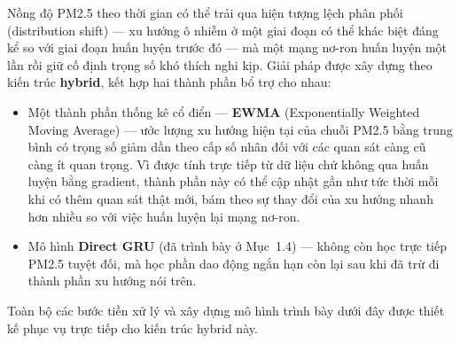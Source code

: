 \documentclass[12pt,oneside]{report}
\begin{document}
Nồng độ PM2.5 theo thời gian có thể trải qua hiện tượng lệch phân phối (distribution shift) — xu hướng ô nhiễm ở một giai đoạn có thể khác biệt đáng kể so với giai đoạn huấn luyện trước đó — mà một mạng nơ-ron huấn luyện một lần rồi giữ cố định trọng số khó thích nghi kịp. Giải pháp được xây dựng theo kiến trúc \textbf{hybrid}, kết hợp hai thành phần bổ trợ cho nhau:

\begin{itemize}
    \item Một thành phần thống kê cổ điển — \textbf{EWMA} (Exponentially Weighted Moving Average) — ước lượng xu hướng hiện tại của chuỗi PM2.5 bằng trung bình có trọng số giảm dần theo cấp số nhân đối với các quan sát càng cũ càng ít quan trọng. Vì được tính trực tiếp từ dữ liệu chứ không qua huấn luyện bằng gradient, thành phần này có thể cập nhật gần như tức thời mỗi khi có thêm quan sát thật mới, bám theo sự thay đổi của xu hướng nhanh hơn nhiều so với việc huấn luyện lại mạng nơ-ron.
    \item Mô hình \textbf{Direct GRU} (đã trình bày ở Mục~1.4) — không còn học trực tiếp PM2.5 tuyệt đối, mà học phần dao động ngắn hạn còn lại sau khi đã trừ đi thành phần xu hướng nói trên.
\end{itemize}

Toàn bộ các bước tiền xử lý và xây dựng mô hình trình bày dưới đây được thiết kế phục vụ trực tiếp cho kiến trúc hybrid này.
\end{document}
